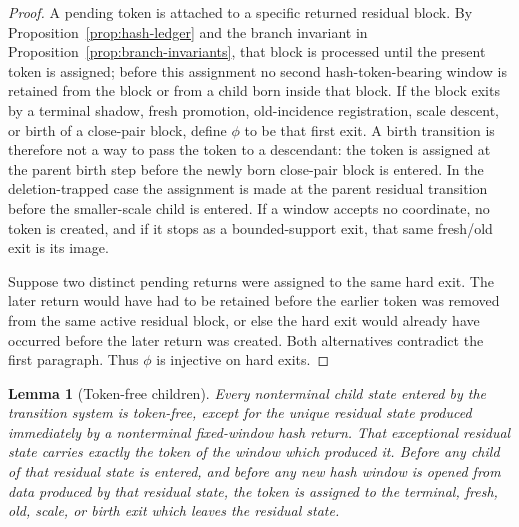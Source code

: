\documentclass[11pt]{article}
\newtheorem{lemma}[theorem]{Lemma}
\begin{document}
\begin{proof}
A pending token is attached to a specific returned residual block.  By
Proposition~\ref{prop:hash-ledger} and the branch invariant in
Proposition~\ref{prop:branch-invariants}, that block is processed until the
present token is assigned; before this assignment no second hash-token-bearing
window is retained from the block or from a child born inside that block.  If
the block exits by a terminal shadow, fresh promotion, old-incidence
registration, scale descent, or birth of a close-pair block, define $\phi$ to
be that first exit.  A birth transition is therefore not a way to pass the token
to a descendant: the token is assigned at the parent birth step before the
newly born close-pair block is entered.  In the deletion-trapped case the
assignment is made at the parent residual transition before the smaller-scale
child is entered.  If a window accepts no coordinate, no token is created, and
if it stops as a bounded-support exit, that same fresh/old exit is its image.

Suppose two distinct pending returns were assigned to the same hard exit.  The
later return would have had to be retained before the earlier token was removed
from the same active residual block, or else the hard exit would already have
occurred before the later return was created.  Both alternatives contradict the
first paragraph.  Thus $\phi$ is injective on hard exits.
\end{proof}

\begin{lemma}[Token-free children]
\label{lem:token-free-children}
Every nonterminal child state entered by the transition system is token-free,
except for the unique residual state produced immediately by a nonterminal
fixed-window hash return.  That exceptional residual state carries exactly the
token of the window which produced it.  Before any child of that residual state
is entered, and before any new hash window is opened from data produced by that
residual state, the token is assigned to the terminal, fresh, old, scale, or
birth exit which leaves the residual state.
\end{lemma}
\end{document}

